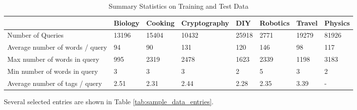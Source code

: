\documentclass{article}
\begin{document}
\begin{table}[!]
\centering
\caption{Summary Statistics on Training and Test Data}
\label{tab:stats}
\begin{tabular}{|l|l|l|l|l|l|l|l|}
\hline
& Biology & Cooking & Cryptography & DIY & Robotics & Travel & Physics \\ \hline
Number of Queries & 13196  & 15404   & 10432 & 25918 & 2771 & 19279 & 81926  \\ \hline
Average number of words / query & 94 & 90 & 131 & 120 & 146 & 98 & 117 \\ \hline
Max number of words in query & 995 & 2319 & 2478 & 1623 & 2339 & 1198 & 3183 \\ \hline
Min number of words in query & 3 & 3 & 3 & 2 & 5 & 3 & 2 \\ \hline
Average number of tags / query & 2.51 & 2.31 & 2.44 & 2.28 & 2.35 & 3.39 & -
\\ \hline
\end{tabular}
\end{table}

Several selected entries are shown in Table \ref{tab:sample_data_entries}. 
\end{document}
